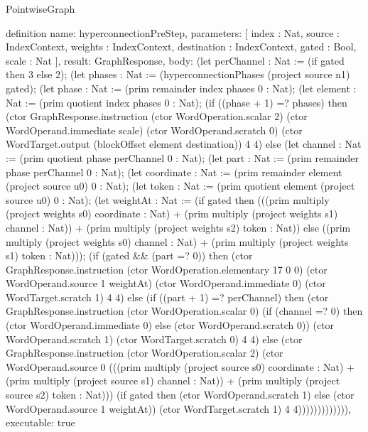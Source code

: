 \begin{lexlean}{PointwiseGraph}
\begin{semanticmodule}
definition{
  name: hyperconnectionPreStep,
  parameters: [
    index : Nat,
    source : IndexContext,
    weights : IndexContext,
    destination : IndexContext,
    gated : Bool,
    scale : Nat
  ],
  result: GraphResponse,
  body: (let perChannel : Nat := (if gated then 3 else 2); (let phases : Nat := (hyperconnectionPhases (project source n1) gated); (let phase : Nat := (prim remainder index phases 0 : Nat); (let element : Nat := (prim quotient index phases 0 : Nat); (if ((phase + 1) =? phases) then (ctor GraphResponse.instruction (ctor WordOperation.scalar 2) (ctor WordOperand.immediate scale) (ctor WordOperand.scratch 0) (ctor WordTarget.output (blockOffset element destination)) 4 4) else (let channel : Nat := (prim quotient phase perChannel 0 : Nat); (let part : Nat := (prim remainder phase perChannel 0 : Nat); (let coordinate : Nat := (prim remainder element (project source u0) 0 : Nat); (let token : Nat := (prim quotient element (project source u0) 0 : Nat); (let weightAt : Nat := (if gated then (((prim multiply (project weights s0) coordinate : Nat) + (prim multiply (project weights s1) channel : Nat)) + (prim multiply (project weights s2) token : Nat)) else ((prim multiply (project weights s0) channel : Nat) + (prim multiply (project weights s1) token : Nat))); (if (gated && (part =? 0)) then (ctor GraphResponse.instruction (ctor WordOperation.elementary 17 0 0) (ctor WordOperand.source 1 weightAt) (ctor WordOperand.immediate 0) (ctor WordTarget.scratch 1) 4 4) else (if ((part + 1) =? perChannel) then (ctor GraphResponse.instruction (ctor WordOperation.scalar 0) (if (channel =? 0) then (ctor WordOperand.immediate 0) else (ctor WordOperand.scratch 0)) (ctor WordOperand.scratch 1) (ctor WordTarget.scratch 0) 4 4) else (ctor GraphResponse.instruction (ctor WordOperation.scalar 2) (ctor WordOperand.source 0 (((prim multiply (project source s0) coordinate : Nat) + (prim multiply (project source s1) channel : Nat)) + (prim multiply (project source s2) token : Nat))) (if gated then (ctor WordOperand.scratch 1) else (ctor WordOperand.source 1 weightAt)) (ctor WordTarget.scratch 1) 4 4))))))))))))),
  executable: true
}


\end{semanticmodule}
\end{lexlean}
